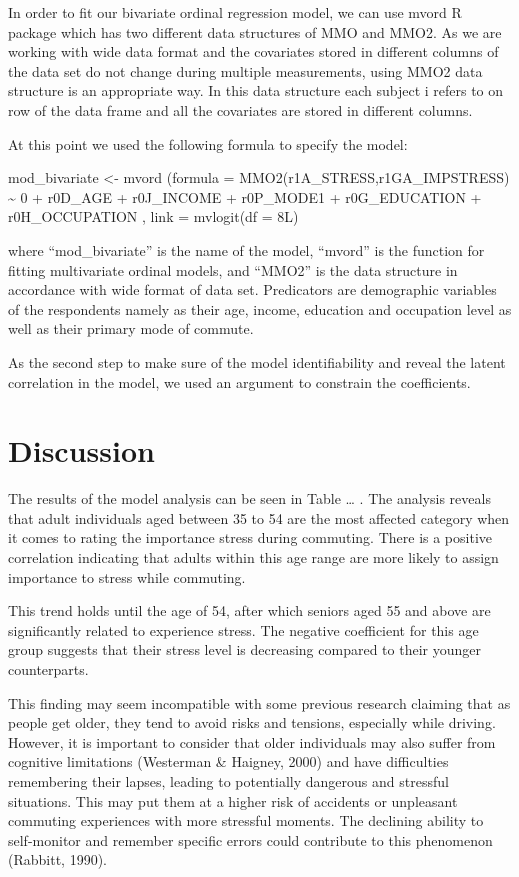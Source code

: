 \documentclass[
11pt, %
oneside, %
english, %
singlespacing, %
]{macthesis} %
\begin{document}
In order to fit our bivariate ordinal regression model, we can use mvord R package which has two different data structures of MMO and MMO2. As we are working with wide data format and the covariates stored in different columns of the data set do not change during multiple measurements, using MMO2 data structure is an appropriate way. In this data structure each subject i refers to on row of the data frame and all the covariates are stored in different columns.

At this point we used the following formula to specify the model:

mod\_bivariate \textless- mvord (formula = MMO2(r1A\_STRESS,r1GA\_IMPSTRESS) \textasciitilde{} 0 + r0D\_AGE + r0J\_INCOME + r0P\_MODE1 + r0G\_EDUCATION + r0H\_OCCUPATION ,
link = mvlogit(df = 8L)

where ``mod\_bivariate'' is the name of the model, ``mvord'' is the function for fitting multivariate ordinal models, and ``MMO2'' is the data structure in accordance with wide format of data set. Predicators are demographic variables of the respondents namely as their age, income, education and occupation level as well as their primary mode of commute.

As the second step to make sure of the model identifiability and reveal the latent correlation in the model, we used an argument to constrain the coefficients.

\hypertarget{discussion}{%
\section{Discussion}\label{discussion}}

The results of the model analysis can be seen in Table \ldots{} . The analysis reveals that adult individuals aged between 35 to 54 are the most affected category when it comes to rating the importance stress during commuting. There is a positive correlation indicating that adults within this age range are more likely to assign importance to stress while commuting.

This trend holds until the age of 54, after which seniors aged 55 and above are significantly related to experience stress. The negative coefficient for this age group suggests that their stress level is decreasing compared to their younger counterparts.

This finding may seem incompatible with some previous research claiming that as people get older, they tend to avoid risks and tensions, especially while driving. However, it is important to consider that older individuals may also suffer from cognitive limitations (Westerman \& Haigney, 2000) and have difficulties remembering their lapses, leading to potentially dangerous and stressful situations. This may put them at a higher risk of accidents or unpleasant commuting experiences with more stressful moments. The declining ability to self-monitor and remember specific errors could contribute to this phenomenon (Rabbitt, 1990).
\end{document}
